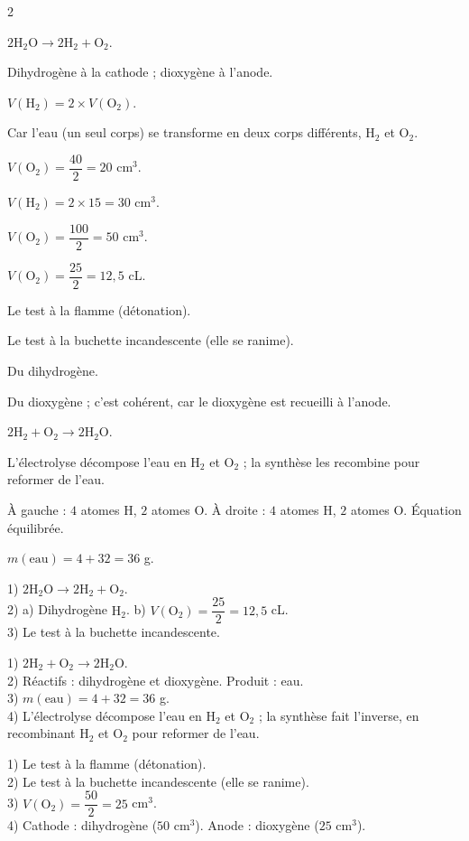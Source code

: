 \begin{multicols}{2}

$2\mathrm{H_2O}\to2\mathrm{H_2}+\mathrm{O_2}$.

Dihydrogène à la cathode ; dioxygène à l'anode.

$V(\mathrm{H_2})=2\times V(\mathrm{O_2})$.

Car l'eau (un seul corps) se transforme en deux corps différents, $\mathrm{H_2}$ et
$\mathrm{O_2}$.

$V(\mathrm{O_2})=\dfrac{40}2=20$ cm$^{3}$.

$V(\mathrm{H_2})=2\times15=30$ cm$^{3}$.

$V(\mathrm{O_2})=\dfrac{100}2=50$ cm$^{3}$.

$V(\mathrm{O_2})=\dfrac{25}2=12{,}5$ cL.

Le test à la flamme (détonation).

Le test à la buchette incandescente (elle se ranime).

Du dihydrogène.

Du dioxygène ; c'est cohérent, car le dioxygène est recueilli à l'anode.

$2\mathrm{H_2}+\mathrm{O_2}\to2\mathrm{H_2O}$.

L'électrolyse décompose l'eau en $\mathrm{H_2}$ et $\mathrm{O_2}$ ; la synthèse les
recombine pour reformer de l'eau.

À gauche : $4$ atomes H, $2$ atomes O. À droite : $4$ atomes H, $2$ atomes O. Équation
équilibrée.

$m(\text{eau})=4+32=36$ g.

1) $2\mathrm{H_2O}\to2\mathrm{H_2}+\mathrm{O_2}$.\\
2) a) Dihydrogène $\mathrm{H_2}$. b) $V(\mathrm{O_2})=\dfrac{25}2=12{,}5$ cL.\\
3) Le test à la buchette incandescente.

1) $2\mathrm{H_2}+\mathrm{O_2}\to2\mathrm{H_2O}$.\\
2) Réactifs : dihydrogène et dioxygène. Produit : eau.\\
3) $m(\text{eau})=4+32=36$ g.\\
4) L'électrolyse décompose l'eau en $\mathrm{H_2}$ et $\mathrm{O_2}$ ; la synthèse fait
l'inverse, en recombinant $\mathrm{H_2}$ et $\mathrm{O_2}$ pour reformer de l'eau.

1) Le test à la flamme (détonation).\\
2) Le test à la buchette incandescente (elle se ranime).\\
3) $V(\mathrm{O_2})=\dfrac{50}2=25$ cm$^{3}$.\\
4) Cathode : dihydrogène ($50$ cm$^{3}$). Anode : dioxygène ($25$ cm$^{3}$).

\end{multicols}
\exercicesBanner
